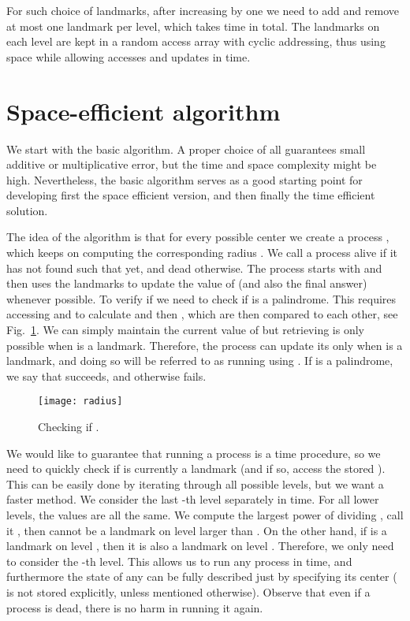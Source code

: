 \documentclass{article}[11pt,letter]
\begin{document}
For such choice of landmarks, after increasing  by one we need to add and remove at
most one landmark per level, which takes  time in total. The landmarks
on each level are kept in a random access array with cyclic addressing, thus using 
 space while allowing accesses and updates in  time.

\section{Space-efficient algorithm}
\label{section:basic}
We start with the basic algorithm. A proper choice of all  guarantees small additive or multiplicative error, but the time and
space complexity might be high. Nevertheless, the basic algorithm serves as a good starting point for developing first the space efficient version,
and then finally the time efficient solution.

The idea of the algorithm is that for every possible center  we create a process , which keeps on computing the corresponding
radius . We call a process alive if it has not found  such that
 yet, and dead otherwise. The process starts with  and then uses the landmarks to update the value
of  (and also the final answer) whenever possible.
To verify if  we need to check if  is a palindrome. This requires accessing
 and  to calculate  and then , which
are then compared to each other, see Fig.~\ref{fig:radius}.
We can simply maintain the current value of  but retrieving  is only possible when  is a landmark.
Therefore, the process  can update its  only when  is a landmark, and doing so will be referred to as running  using . If 
is a palindrome, we say that  succeeds, and otherwise fails.

\begin{figure}[t]
\texttt{[image: radius]}
\caption{Checking if .}
\label{fig:radius}
\end{figure}

We would like to guarantee that running a process is a  time procedure, so we need to quickly check if 
is currently a landmark (and if so, access the stored ). This can be easily done by iterating through all possible levels, but we want a
faster method. We consider the last -th level separately in  time. For all lower levels, the values  are all the same. We compute
the largest power of  dividing , call it , then  cannot be a landmark on level larger than .
On the other hand, if  is a landmark on level , then it is also a landmark on level . Therefore, we only need to consider the
-th level. This allows us to run any process in  time, and furthermore the state of any 
can be fully described just by specifying its center  ( is not stored explicitly, unless mentioned otherwise).
Observe that even if a process is dead, there is no harm in running it again.
\end{document}
